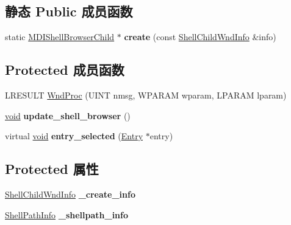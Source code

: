 \subsection*{静态 Public 成员函数}
\begin{DoxyCompactItemize}
\item 
\mbox{\label{struct_m_d_i_shell_browser_child_a1b0e1814f947d9e6e676d8c5d46ac738}} 
static \hyperlink{struct_m_d_i_shell_browser_child}{M\+D\+I\+Shell\+Browser\+Child} $\ast$ {\bfseries create} (const \hyperlink{struct_shell_child_wnd_info}{Shell\+Child\+Wnd\+Info} \&info)
\end{DoxyCompactItemize}
\subsection*{Protected 成员函数}
\begin{DoxyCompactItemize}
\item 
L\+R\+E\+S\+U\+LT \hyperlink{struct_m_d_i_shell_browser_child_a549230d9766a8cd6202a7dfd11ab711e}{Wnd\+Proc} (U\+I\+NT nmsg, W\+P\+A\+R\+AM wparam, L\+P\+A\+R\+AM lparam)
\item 
\mbox{\label{struct_m_d_i_shell_browser_child_a994b8f74fa4135abb895c72eb644b8b8}} 
\hyperlink{interfacevoid}{void} {\bfseries update\+\_\+shell\+\_\+browser} ()
\item 
\mbox{\label{struct_m_d_i_shell_browser_child_a629f7b3fa3b84a6d64e7e0b78208c247}} 
virtual \hyperlink{interfacevoid}{void} {\bfseries entry\+\_\+selected} (\hyperlink{struct_entry}{Entry} $\ast$entry)
\end{DoxyCompactItemize}
\subsection*{Protected 属性}
\begin{DoxyCompactItemize}
\item 
\mbox{\label{struct_m_d_i_shell_browser_child_a552e9c546889245a7ece2261b88bafcf}} 
\hyperlink{struct_shell_child_wnd_info}{Shell\+Child\+Wnd\+Info} {\bfseries \+\_\+create\+\_\+info}
\item 
\mbox{\label{struct_m_d_i_shell_browser_child_acf704d2c2f7b83763b0d6dfd43adb7fc}} 
\hyperlink{struct_shell_path_info}{Shell\+Path\+Info} {\bfseries \+\_\+shellpath\+\_\+info}
\end{DoxyCompactItemize}
